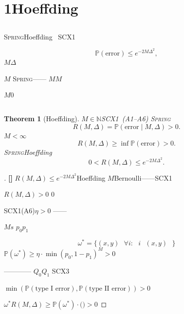 \documentclass[12pt,a4paper]{article}
\newtheorem{theorem}{Theorem}[section]
\theoremstyle{remark}
\newcommand{\N}{\mathbb{N}}
\newcommand{\Pbb}{\mathbb{P}}
\newcommand{\Spring}{\textsc{Spring}}
\newcommand{\rigorous}{\textnormal{\textbf{[]}}}
\begin{document}
\newpage

\section{1Hoeffding}

\subsection{}

\Spring{}Hoeffding~\cite{hoeffding1963}
SCX1~\cite{scx_ml_audit}

\begin{equation}\label{eq:hoeffding_original}
    \Pbb(\text{error}) \leq e^{-2M\Delta^2},
\end{equation}
$M$$\Delta$

$M$
\Spring{}——
$M$$M$


$M$0
\textbf{}

\subsection{}



\begin{theorem}[Hoeffding]\label{thm:hoeffding_residual}
$M \in \N$SCX1~(A1--A6)
\Spring{}
\begin{equation}
    R(M, \Delta) = \Pbb(\text{error} \mid M, \Delta) > 0.
\end{equation}
$M < \infty$
\begin{equation}\label{eq:residual_positive}
    R(M, \Delta) \geq \inf_{\text{}} \Pbb(\text{error}) > 0.
\end{equation}
\Spring{}Hoeffding
\begin{equation}
    0 < R(M, \Delta) \leq e^{-2M\Delta^2}.
\end{equation}
\end{theorem}

\begin{proof}[]\rigorous
$R(M, \Delta) \leq e^{-2M\Delta^2}$Hoeffding
$M$Bernoulli——SCX1~\cite{scx_ml_audit}

$R(M, \Delta) > 0$
0

SCX1(A6)$\eta > 0$
——


$M$$s$
$p_0$$p_1$

\begin{equation}
    \omega^* = \{(x, y) \text{  } \forall i: \text{ } i \text{  } (x, y) \text{ }\}
\end{equation}
$\Pbb(\omega^*) \geq \eta \cdot \min(p_0, 1-p_1)^M > 0$

————
$Q_0$$Q_1$
SCX3

$\min(\Pbb(\text{type I error}), \Pbb(\text{type II error})) > 0$

$\omega^*$$R(M, \Delta) \geq \Pbb(\omega^*) \cdot \text{()} > 0$

\end{proof}
\end{document}
